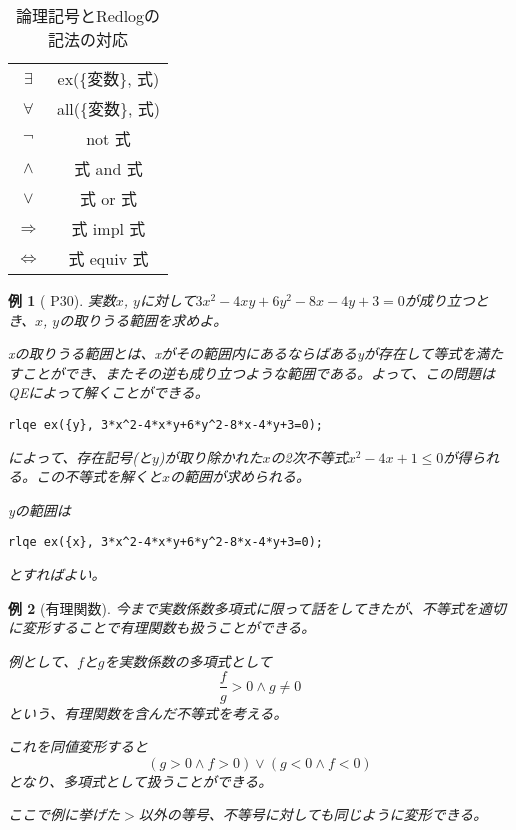 \documentclass[a4j,12pt]{jarticle}
\theoremstyle{break}
\newtheorem{Example}{例}[section]
\begin{document}
\begin{table}[h]
\begin{center}
\caption{論理記号とRedlogの記法の対応}
\begin{tabular}{|c|c|}
\hline
$\exists$ & ex(\{変数\}, 式) \\
$\forall$ & all(\{変数\}, 式) \\
$\lnot$ & not 式 \\
$\wedge$ & 式 and 式 \\
$\vee$ & 式 or 式 \\
$\Rightarrow$ & 式 impl 式 \\
$\Leftrightarrow$ & 式 equiv 式 \\
\hline
\end{tabular}
\end{center}
\end{table}

\begin{Example}[\cite{QEの計算アルゴリズムとその応用} P30]
実数$x$, $y$に対して$3x^2 - 4xy + 6y^2 - 8x - 4y + 3 = 0$が成り立つとき、$x$, $y$の取りうる範囲を求めよ。

xの取りうる範囲とは、xがその範囲内にあるならばあるyが存在して等式を満たすことができ、またその逆も成り立つような範囲である。よって、この問題はQEによって解くことができる。
\begin{framed}
\begin{verbatim}
rlqe ex({y}, 3*x^2-4*x*y+6*y^2-8*x-4*y+3=0);
\end{verbatim}
\end{framed}
によって、存在記号(と$y$)が取り除かれた$x$の2次不等式$x^2-4x+1 \le 0$が得られる。この不等式を解くと$x$の範囲が求められる。

yの範囲は
\begin{framed}
\begin{verbatim}
rlqe ex({x}, 3*x^2-4*x*y+6*y^2-8*x-4*y+3=0);
\end{verbatim}
\end{framed}
とすればよい。
\end{Example}

\begin{Example}[有理関数]
今まで実数係数多項式に限って話をしてきたが、不等式を適切に変形することで有理関数も扱うことができる。

例として、$f$と$g$を実数係数の多項式として
\[ \frac{f}{g} > 0 \wedge g \ne 0 \]
という、有理関数を含んだ不等式を考える。

これを同値変形すると
\[ (g > 0 \wedge f > 0) \vee (g < 0 \wedge f < 0)\]
となり、多項式として扱うことができる。

ここで例に挙げた$>$以外の等号、不等号に対しても同じように変形できる。
\end{Example}
\end{document}
